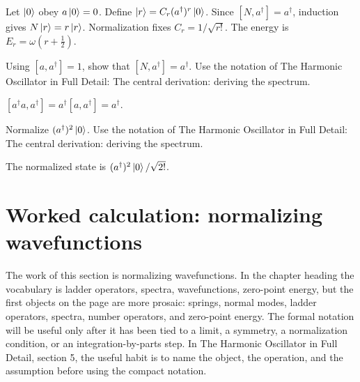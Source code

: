 \begin{example}
Let \(\left|0\right\rangle\) obey \(a\left|0\right\rangle=0\).  Define \(\left|r\right\rangle=C_r(a^\dagger)^r\left|0\right\rangle\).  Since \([N,a^\dagger]=a^\dagger\), induction gives \(N\left|r\right\rangle=r\left|r\right\rangle\).  Normalization fixes \(C_r=1/\sqrt{r!}\).  The energy is \(E_r=\omega(r+\frac12)\).
\end{example}



\begin{exercise}
Using \([a,a^\dagger]=1\), show that \([N,a^\dagger]=a^\dagger\).  Use the notation of The Harmonic Oscillator in Full Detail: The central derivation: deriving the spectrum.
\begin{answer}
\([a^\dagger a,a^\dagger]=a^\dagger[a,a^\dagger]=a^\dagger\).
\end{answer}
\end{exercise}

\begin{exercise}
Normalize \((a^\dagger)^2\left|0\right\rangle\).  Use the notation of The Harmonic Oscillator in Full Detail: The central derivation: deriving the spectrum.
\begin{answer}
The normalized state is \((a^\dagger)^2\left|0\right\rangle/\sqrt{2!}\).
\end{answer}
\end{exercise}



\section{Worked calculation: normalizing wavefunctions}













The work of this section is normalizing wavefunctions.  In the chapter heading the vocabulary is ladder operators, spectra, wavefunctions, zero-point energy, but the first objects on the page are more prosaic: springs, normal modes, ladder operators, spectra, number operators, and zero-point energy.  The formal notation will be useful only after it has been tied to a limit, a symmetry, a normalization condition, or an integration-by-parts step.  In The Harmonic Oscillator in Full Detail, section 5, the useful habit is to name the object, the operation, and the assumption before using the compact notation.

